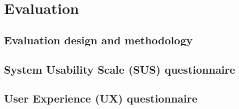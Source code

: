 \section{Evaluation}

\subsection{Evaluation design and methodology}

\subsection{System Usability Scale (SUS) questionnaire}

\subsection{User Experience (UX) questionnaire}

